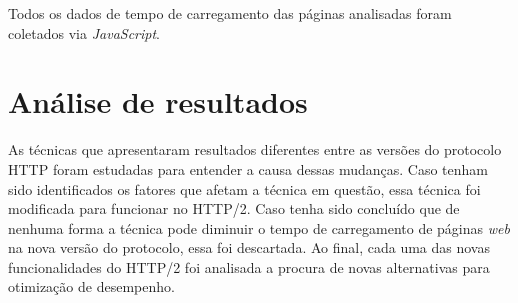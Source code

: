 Todos os dados de tempo de carregamento das páginas analisadas foram coletados via \textit{JavaScript}. %

\section{Análise de resultados}
\label{sec:analisederesultados}

As técnicas que apresentaram resultados diferentes entre as versões do protocolo HTTP foram estudadas para entender a causa dessas mudanças. Caso tenham sido identificados os fatores que afetam a técnica em questão, essa técnica foi modificada para funcionar no HTTP/2. Caso tenha sido concluído que de nenhuma forma a técnica pode diminuir o tempo de carregamento de páginas \textit{web} na nova versão do protocolo, essa foi descartada. Ao final, cada uma das novas funcionalidades do HTTP/2 foi analisada a procura de novas alternativas para otimização de desempenho.